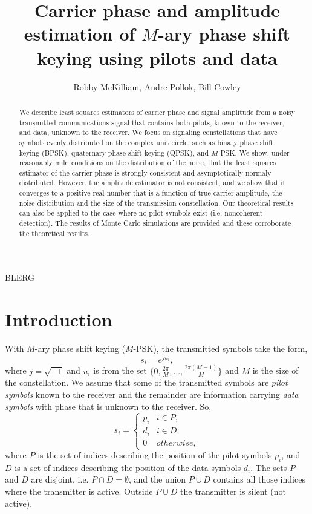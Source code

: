 \documentclass[journal]{IEEEtran}
\title{Carrier phase and amplitude estimation of $M$-ary phase shift keying using pilots and data}
\author{Robby McKilliam, Andre Pollok, Bill Cowley}
\begin{document}
\maketitle

\begin{abstract}
We describe least squares estimators of carrier phase and signal amplitude from a noisy transmitted communications signal that contains both pilots, known to the receiver, and data, unknown to the receiver.  We focus on signaling constellations that have symbols evenly distributed on the complex unit circle, such as binary phase shift keying (BPSK), quaternary phase shift keying (QPSK), and $M$-PSK.  We show, under reasonably mild conditions on the distribution of the noise, that the least squares estimator of the carrier phase is strongly consistent and asymptotically normaly distributed.  However, the amplitude estimator is not consistent, and we show that it converges to a positive real number that is a function of true carrier amplitude, the noise distribution and the size of the transmission constellation.  Our theoretical results can also be applied to the case where no pilot symbols exist (i.e. noncoherent detection).  The results of Monte Carlo simulations are provided and these corroborate the theoretical results.   
\end{abstract}
\begin{IEEEkeywords}
BLERG
\end{IEEEkeywords}

\section{Introduction}

With $M$-ary phase shift keying ($M$-PSK), the transmitted symbols take the form,
\[
s_i = e^{j u_i},
\]
where $j = \sqrt{-1}$ and $u_i$ is from the set $\{0, \tfrac{2\pi}{M}, \dots, \tfrac{2\pi(M-1)}{M}\}$ and $M$ is the size of the constellation.  We assume that some of the transmitted symbols are \emph{pilot symbols} known to the receiver and the remainder are information carrying \emph{data symbols} with phase that is unknown to the receiver.  So,
\[
s_i = \begin{cases}
p_i & i \in P, \\
d_i & i \in D, \\
0 & otherwise,
\end{cases}
\]
where $P$ is the set of indices describing the position of the pilot symbols $p_i$, and $D$ is a set of indices describing the position of the data symbols $d_i$.  The sets $P$ and $D$ are disjoint, i.e. $P \cap D = \emptyset$, and the union $P \cup D$ contains all those indices where the transmitter is active.  Outside $P \cup D$ the transmitter is silent (not active).  
\end{document}
